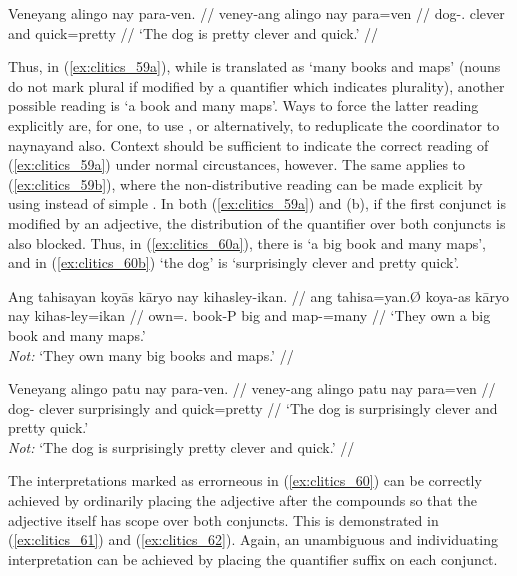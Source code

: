 \a\label{ex:clitics_59b}\begingl
	\gla Veneyang alingo nay para-ven. //
	\glb veney-ang alingo nay para=ven //
	\glc dog-.\Aarg{} clever and quick=pretty //
	\glft `The dog is pretty clever and quick.' //
\endgl
\xe

Thus, in (\ref{ex:clitics_59a}), while  is translated as `many books and maps' (nouns do not mark
plural if modified by a quantifier which indicates plurality), another possible
reading is `a book and many maps'. Ways to force the latter reading explicitly
are, for one, to use , or
alternatively, to reduplicate the coordinator  to
 {naynay}{and also}. Context should be sufficient to indicate the
correct reading of (\ref{ex:clitics_59a}) under normal circustances, however.
The same applies to (\ref{ex:clitics_59b}), where the non-distributive reading
can be made explicit by using  instead of simple
. In both (\ref{ex:clitics_59a}) and (b), if the first conjunct
is modified by an adjective, the distribution of the quantifier over both
conjuncts is also blocked. Thus, in (\ref{ex:clitics_60a}), there is `a big
book and many maps', and in (\ref{ex:clitics_60b}) `the dog' is `surprisingly
clever and pretty quick'.

\pex\label{ex:clitics_60}
\a\label{ex:clitics_60a}\begingl
	\gla Ang tahisayan koyās kāryo nay kihasley-ikan. //
	\glb ang tahisa=yan.Ø koya-as kāryo nay kihas-ley=ikan //
	\glc \AgtT{} own=\TplM{}.\Top{} book-P big and map-\PargI{}=many //
	\glft `They own a big book and many maps.' \\
		\textit{Not:} `They own many big books and maps.' //
\endgl

\a\label{ex:clitics_60b}\begingl
	\gla Veneyang alingo patu nay para-ven. //
	\glb veney-ang alingo patu nay para=ven //
	\glc dog-\Aarg{} clever surprisingly and quick=pretty //
	\glft `The dog is surprisingly clever and pretty quick.' \\
		\textit{Not:} `The dog is surprisingly pretty clever and quick.' //
\endgl
\xe

The interpretations marked as errorneous in (\ref{ex:clitics_60}) can be
correctly achieved by ordinarily placing the adjective after the compounds so
that the adjective itself has scope over both conjuncts. This is demonstrated
in (\ref{ex:clitics_61}) and (\ref{ex:clitics_62}). Again, an unambiguous and
individuating interpretation can be achieved by placing the quantifier suffix
on each conjunct.

